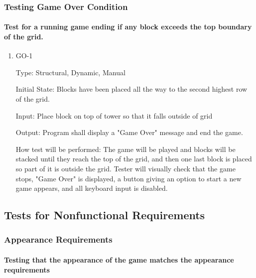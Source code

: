 \documentclass[12pt, titlepage]{article}
\begin{document}
\subsubsection{Testing Game Over Condition}
\paragraph{Test for a running game ending if any block exceeds the top boundary of the grid.}

\begin{enumerate}

\item{GO-1\\}

Type: Structural, Dynamic, Manual
					
Initial State: Blocks have been placed all the way to the second highest row of the grid.
					
Input: Place block on top of tower so that it falls outside of grid
					
Output: Program shall display a "Game Over" message and end the game.
					
How test will be performed: The game will be played and blocks will be stacked until they reach the top of the grid, and then one last block is placed so part of it is outside the grid. Tester will visually check that the game stops, "Game Over" is displayed, a button giving an option to start a new game appears, and all keyboard input is disabled.

\end{enumerate}

\subsection{Tests for Nonfunctional Requirements}

\subsubsection{Appearance Requirements}
		
\paragraph{Testing that the appearance of the game matches the appearance requirements}
\end{document}
